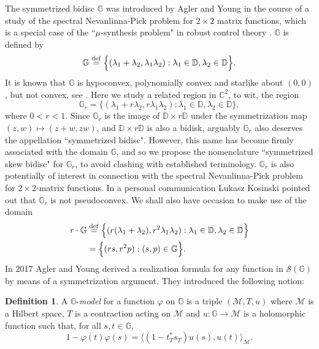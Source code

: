 \documentclass[12pt,reqno]{amsart}
\numberwithin{equation}{section}
\renewcommand\phi{\varphi}
\def\d{\mathbb{D}}
\def\c{\mathbb{C}}
\def\m{\mathcal{M}}
\def\ph{\phi}
\newcommand\calm{\mathcal{M}}
\newcommand\df{\stackrel{\rm def}{=}}
\def\be{\begin{equation}}
\def\ee{\end{equation}}
\def\ip#1#2{\langle #1,#2\rangle}
\theoremstyle{definition}
\newtheorem{defin}[equation]{Definition}
\begin{document}
The symmetrized bidisc $\mathbb{G}$ was introduced by Agler and Young  in the course of a study of the spectral Nevanlinna-Pick problem for $2 \times 2$ matrix functions, which is a special case of the ``$\mu$-synthesis problem" in robust control theory \cite{doyle}.  $\mathbb{G}$ is defined by
\be\label{defGr}
\mathbb{G}\stackrel{\rm def}{=}  \Big\{( \lambda_{1}+\lambda_{2} ,\lambda_{1}\lambda_{2}): \lambda_{1}\in \mathbb{D}, \lambda_{2}\in\mathbb{D}\Big\}.
\ee
It is known that $\mathbb{G}$ is hypoconvex, polynomially convex and starlike about $(0,0)$, but not convex, see \cite[Theorem 2.3]{HGSB}. 
Here we study a related region in $\c^2$, to wit,  the region
$$
 \mathbb{G}_{r} = \Big\{( \lambda_{1}+r\lambda_{2} ,r\lambda_{1}\lambda_{2}): \lambda_{1}\in \mathbb{D}, \lambda_{2}\in\mathbb{D}\Big\},
$$
where $0<r<1$.  Since $\mathbb{G}_{r}$ is the image of $\d\times r\d$ under the symmetrization map $(z,w) \mapsto (z+w,zw)$, and $\d\times r\d$ is also a bidisk, arguably $\mathbb{G}_{r}$ also deserves the appellation ``symmetrized bidisc".  However, this name has become firmly associated with the domain $\mathbb{G}$, and so we propose the nomenclature ``symmetrized skew bidisc" for $\mathbb{G}_{r}$, to avoid clashing with established terminology.  $\mathbb{G}_{r}$ is also potentially of interest in connection with the spectral Nevanlinna-Pick problem for $2\times 2$-matrix functions. 
 In a personal communication Lukasz Kosinski pointed out  that $\mathbb{G}_{r}$ is not pseudoconvex. 
 We shall also have occasion to make use of the domain 
\begin{align} \label{defrdotG}
 r \cdot \mathbb{G} &\df \Big\{(r(\lambda_{1}+\lambda_{2}),r^{2}\lambda_{1}\lambda_{2}): \lambda_{1}\in\mathbb{D}, \lambda_{2}\in\mathbb{D}\Big\}\\
 &=\Big\{(rs,r^2p):(s,p)\in\mathbb{G}\Big\}.
\end{align}
In 2017 Agler and Young \cite{AY17} derived a realization formula for any function in $\mathcal{S}(\mathbb{G})$ by means of a symmetrization argument. They introduced the following notion:
\begin{defin}\label{defGmodel}
A $\mathbb{G}$-\emph{model} for a function $\ph$ on $\mathbb{G}$ is a triple $(\m,T,u)$ where $\calm$ is a Hilbert space, $T$ is a contraction acting on $\calm$ and $u:\mathbb{G} \to \m$ is a holomorphic function such that, for all $s,t\in \mathbb{G}$,
\begin{equation}\label{modelform}
 1-\overline{\ph(t)}\ph(s)= \ip{ (1-t_T^* s_T) u(s)}{u(t)}_\calm.
\end{equation}
\end{defin}
\end{document}
